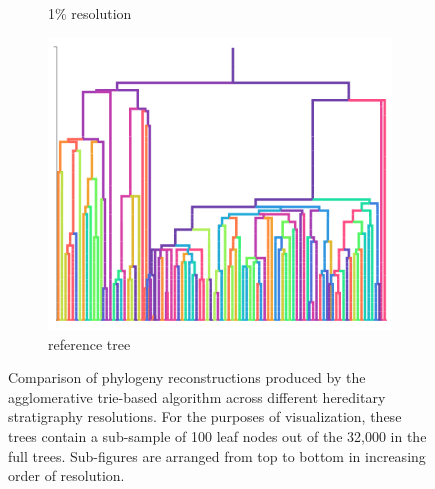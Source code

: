 \begin{figure}
\begin{subfigure}[b]{\linewidth}
    \caption{%
      1\% resolution}
    \label{fig:plain-perfect-and-reconstruction-phylogenies:resolution_100}
  \end{subfigure}
  \begin{subfigure}[b]{\linewidth}
    \centering
    \includegraphics[width=\textwidth, height=0.16\textheight]{img/reference}
    \caption{%
      reference tree}
    \label{fig:plain-perfect-and-reconstruction-phylogenies:reference}
  \end{subfigure}
  \caption{%
    Comparison of phylogeny reconstructions produced by the agglomerative trie-based algorithm across different hereditary stratigraphy resolutions.
    For the purposes of visualization, these trees contain a sub-sample of 100 leaf nodes out of the 32,000 in the full trees.
    Sub-figures are arranged from top to bottom in increasing order of resolution.
  }
  \label{fig:plain-perfect-and-reconstruction-phylogenies}
\end{figure}
